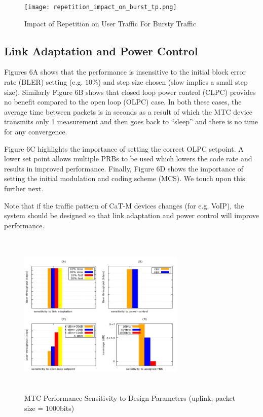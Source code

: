 \documentclass[conference,compsoc]{IEEEtran}
\begin{document}
\begin{figure}[htbp]
\centerline{\texttt{[image: repetition\_impact\_on\_burst\_tp.png]}}
\caption{Impact of Repetition on User Traffic For Bursty Traffic}
\label{fig_rep_burst}
\end{figure}


\subsection{Link Adaptation and Power Control}
Figures $6$A shows that the performance is insensitive to the initial block error rate (BLER) setting (e.g. $10$\%) and step size chosen (slow implies a small step size). Similarly Figure $6$B shows that closed loop power control (CLPC) provides no benefit compared to the open loop (OLPC) case. In both these cases, the average time between packets is in seconds as a result of which the MTC device transmits only 1 measurement and then goes back to “sleep” and there is no time for any convergence.  

Figure $6$C highlights the importance of setting the correct OLPC setpoint. A lower set point allows multiple PRBs to be used which lowers the code rate and results in improved performance. Finally, Figure $6$D shows the importance of setting the initial modulation and coding scheme (MCS). We touch upon this further next.

Note that if the traffic pattern of CaT-M devices changes (for e.g. VoIP), the system should be designed so that link adaptation and power control will improve performance. 
\begin{figure}[htbp]
\centerline{\includegraphics[height=80mm,width=80mm]{sensitivity_to_design.png}}
\caption{MTC Performance Sensitivity to Design Parameters (uplink, packet size = $1000$bits)}
\label{fig_sensitivity}
\end{figure}
\end{document}
